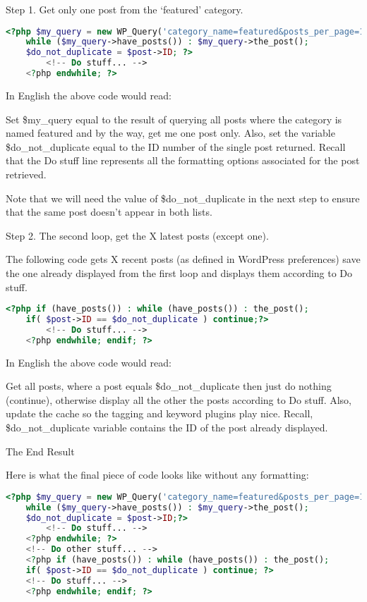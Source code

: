 \begin{compactenum}
\item Step 1. Get only one post from the ‘featured’ category.

\begin{lstlisting}[language=PHP]
	<?php $my_query = new WP_Query('category_name=featured&posts_per_page=1');
	while ($my_query->have_posts()) : $my_query->the_post();
	$do_not_duplicate = $post->ID; ?>
		<!-- Do stuff... -->
	<?php endwhile; ?>
\end{lstlisting}

In English the above code would read:

Set \$my\_query equal to the result of querying all posts where the category is named featured and by the way, get me one post only. Also, set the variable \$do\_not\_duplicate equal to the ID number of the single post returned. Recall that the Do stuff line represents all the formatting options associated for the post retrieved.

Note that we will need the value of \$do\_not\_duplicate in the next step to ensure that the same post doesn't appear in both lists.

\item Step 2. The second loop, get the X latest posts (except one).

The following code gets X recent posts (as defined in WordPress preferences) save the one already displayed from the first loop and displays them according to Do stuff.

\begin{lstlisting}[language=PHP]
	<?php if (have_posts()) : while (have_posts()) : the_post(); 
	if( $post->ID == $do_not_duplicate ) continue;?>
		<!-- Do stuff... -->
	<?php endwhile; endif; ?>
\end{lstlisting}

In English the above code would read:

Get all posts, where a post equals \$do\_not\_duplicate then just do nothing (continue), otherwise display all the other the posts according to Do stuff. Also, update the cache so the tagging and keyword plugins play nice. Recall, \$do\_not\_duplicate variable contains the ID of the post already displayed.

\item The End Result

Here is what the final piece of code looks like without any formatting:

\begin{lstlisting}[language=PHP]
	<?php $my_query = new WP_Query('category_name=featured&posts_per_page=1');
	while ($my_query->have_posts()) : $my_query->the_post();
	$do_not_duplicate = $post->ID;?>
		<!-- Do stuff... -->
	<?php endwhile; ?>
	<!-- Do other stuff... -->
	<?php if (have_posts()) : while (have_posts()) : the_post(); 
	if( $post->ID == $do_not_duplicate ) continue; ?>
	<!-- Do stuff... -->
	<?php endwhile; endif; ?>
\end{lstlisting}


\end{compactenum}
